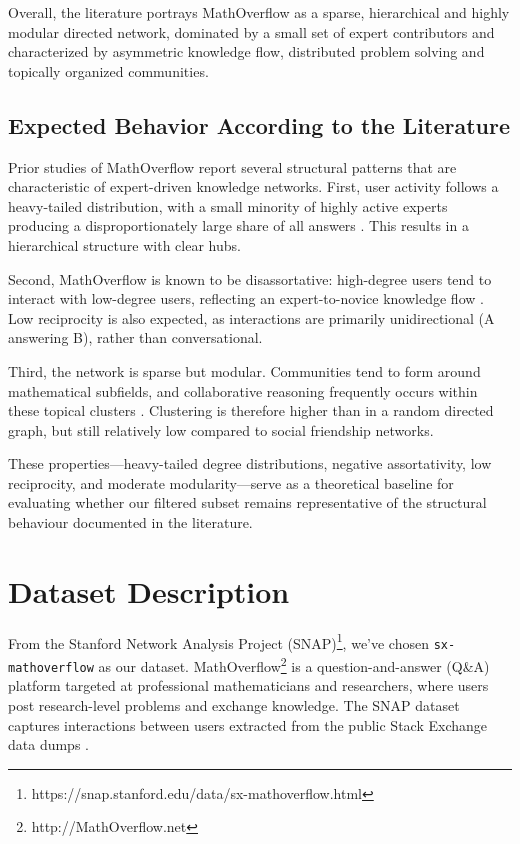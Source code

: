 \documentclass[sigplan]{acmart}
\begin{document}
        Overall, the literature portrays MathOverflow as a sparse, hierarchical and
        highly modular directed network, dominated by a small set of expert contributors
        and characterized by asymmetric knowledge flow, distributed problem solving and
        topically organized communities.

    \subsection{Expected Behavior According to the Literature}
        Prior studies of MathOverflow report several structural patterns that are
        characteristic of expert-driven knowledge networks. First, user activity follows
        a heavy-tailed distribution, with a small minority of highly active experts
        producing a disproportionately large share of all answers \cite{participation2013}.
        This results in a hierarchical structure with clear hubs.
        
        Second, MathOverflow is known to be disassortative: high-degree users tend to
        interact with low-degree users, reflecting an expert-to-novice knowledge flow
        \cite{socialachievement2015}. Low reciprocity is also expected, as interactions are
        primarily unidirectional (A answering B), rather than conversational.
        
        Third, the network is sparse but modular. Communities tend to form around
        mathematical subfields, and collaborative reasoning frequently occurs within
        these topical clusters \cite{collaborative2012}. Clustering is therefore higher than in a
        random directed graph, but still relatively low compared to social friendship
        networks.
        
        These properties—heavy-tailed degree distributions, negative assortativity,
        low reciprocity, and moderate modularity—serve as a theoretical baseline for
        evaluating whether our filtered subset remains representative of the structural
        behaviour documented in the literature.


\section{Dataset Description}\label{sec:dataset-description}

    From the Stanford Network Analysis Project (SNAP)\footnote{https://snap.stanford.edu/data/sx-mathoverflow.html}, we've chosen \texttt{sx-mathoverflow} as our dataset. MathOverflow\footnote{http://MathOverflow.net} is a question-and-answer (Q\&A) platform targeted at professional mathematicians and researchers, where users post research-level problems and exchange knowledge. The SNAP dataset captures interactions between users extracted from the public Stack Exchange data dumps \cite{socialMathoveflow2013}.
\end{document}
